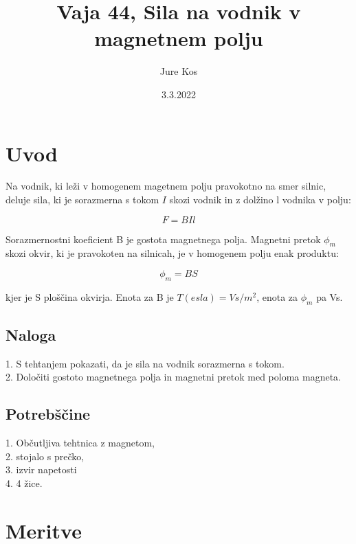 \documentclass[a4paper]{report}
\author{Jure Kos}
\title{Vaja 44, Sila na vodnik v magnetnem polju}
\date{3.3.2022}
\begin{document}
\maketitle

\chapter*{Uvod}
Na vodnik, ki leži v homogenem magetnem polju pravokotno na smer silnic, deluje
sila, ki je sorazmerna s tokom $I$ skozi vodnik in z dolžino l vodnika v polju:

\[F = BIl\]

\noindent Sorazmernostni koeficient B je gostota magnetnega polja. Magnetni pretok $\phi_m$ skozi
okvir, ki je pravokoten na silnicah, je v homogenem polju enak produktu:

\[\phi_m = BS\]

\noindent kjer je S ploščina okvirja. Enota za B je $T(esla)= Vs/m^2$, enota za $\phi_m$ pa Vs.

\section*{Naloga}

1. S tehtanjem pokazati, da je sila na vodnik sorazmerna s tokom.\\
2. Določiti gostoto magnetnega polja in magnetni pretok med poloma magneta.

\section*{Potrebščine}

1. Občutljiva tehtnica z magnetom,\\
2. stojalo s prečko,\\
3. izvir napetosti\\
4. 4 žice.

\chapter*{Meritve}
\end{document}
